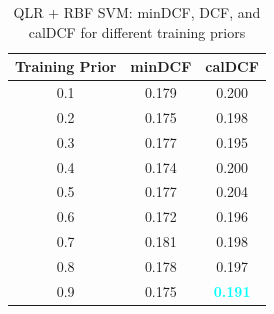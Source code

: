 \documentclass[12pt]{report}
\begin{document}
\begin{table}[H]
    \centering
    \begin{tabular}{|c|c|c|}
        \hline
        \rowcolor{blue!10}
        \textbf{Training Prior} & \textbf{minDCF} & \textbf{calDCF}                  \\
        \hline
        0.1                     & 0.179           & 0.200                            \\
        \hline
        0.2                     & 0.175           & 0.198                            \\
        \hline
        0.3                     & 0.177           & 0.195                            \\
        \hline
        0.4                     & 0.174           & 0.200                            \\
        \hline
        0.5                     & 0.177           & 0.204                            \\
        \hline
        0.6                     & 0.172           & 0.196                            \\
        \hline
        0.7                     & 0.181           & 0.198                            \\
        \hline
        0.8                     & 0.178           & 0.197                            \\
        \hline
        0.9                     & 0.175           & \textcolor{cyan}{\textbf{0.191}} \\
        \hline
    \end{tabular}
    \caption{QLR + RBF SVM: minDCF, DCF, and calDCF for different training priors}
    \label{tab:QLR_RBF_SVM_Priors}
\end{table}
\end{document}
